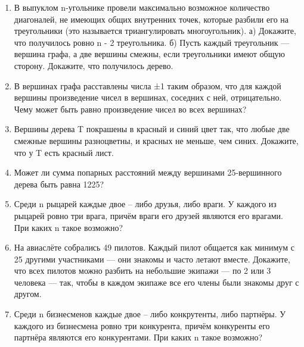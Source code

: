 \documentclass[a4paper,12pt]{article}
\begin{document}
\begin{enumerate}[label=\textbf{Задача \arabic*.}]
\item В выпуклом n-угольнике провели максимально возможное количество диагоналей, не имеющих общих внутренних точек, которые разбили его на треугольники (это называется триангулировать многоугольник).
а) Докажите, что получилось ровно n - 2 треугольника.
б) Пусть каждый треугольник — вершина графа, а две вершины смежны, если треугольники имеют общую сторону. Докажите, что получилось дерево.

\item В вершинах графа расставлены числа ±1 таким образом, что для каждой вершины произведение чисел в вершинах, соседних с ней, отрицательно. Чему может быть равно произведение чисел во всех вершинах?

\item Вершины дерева T покрашены в красный и синий цвет так, что любые две смежные вершины разноцветны, и красных не меньше, чем синих. Докажите, что у T есть красный лист.
\item Может ли сумма попарных расстояний между вершинами 25-вершинного дерева быть равна 1225?

\item Среди n рыцарей каждые двое – либо друзья, либо враги. У каждого из рыцарей ровно три врага, причём враги его друзей являются его врагами. При каких n такое возможно?

\item На авиаслёте собрались 49 пилотов.
Каждый пилот общается как минимум с 25 другими участниками — они знакомы и часто летают вместе. Докажите, что всех пилотов можно разбить на небольшие экипажи — по 2 или 3 человека — так, чтобы в каждом экипаже все его члены были знакомы друг с другом.

\item Среди n бизнесменов каждые двое – либо конкрутенты, либо партнёры. У каждого из бизнесмена ровно три конкурента, причём конкуренты его партнёра являются его конкурентами. При каких n такое возможно?

    
\end{enumerate}
\end{document}
